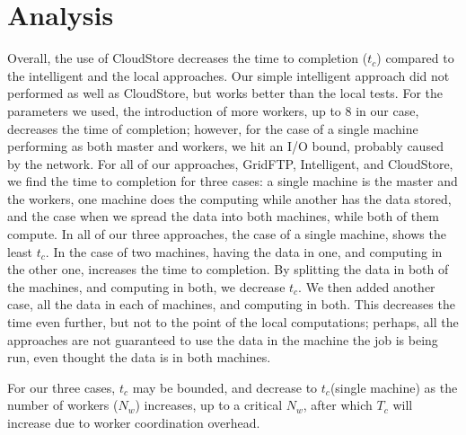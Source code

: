\documentclass{rspublic}
\begin{document}
%

\section{Analysis}

Overall, the use of CloudStore decreases the time to completion
($t_c$) compared to the intelligent and the local approaches. Our
simple intelligent approach did not performed as well as CloudStore, but
works better than the local tests. For the parameters we used, the
introduction of more workers, up to 8 in our case, decreases the time of
completion; however, for the case of a single machine performing as both
master and workers, we hit an I/O bound, probably caused by the network.
For all of our approaches, GridFTP, Intelligent, and CloudStore, we find
the time to completion for three cases: a single machine is the master
and the workers, one machine does the computing while another has the
data stored, and the case when we spread the data into both machines,
while both of them compute.  In all of our three approaches, the case of
a single machine, shows the least $t_c$. In the case of two machines,
having the data in one, and computing in the other one, increases the
time to completion. By splitting the data in both of the machines, and
computing in both, we decrease $t_c$. We then added another case, all
the data in each of machines, and computing in both. This decreases the
time even further, but not to the point of the local computations;
perhaps, all the approaches are not guaranteed to use the data in the
machine the job is being run, even thought the data is in both machines.

For our three cases,  $t_c$ may be bounded, and decrease to $t_c$(single machine) as  the number of workers ($N_w$) increases, up to a critical $N_w$, after which $T_c$ will increase due to worker coordination overhead.
\end{document}
